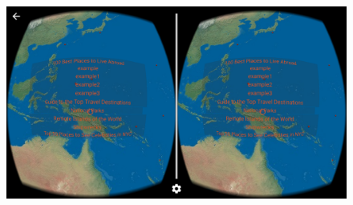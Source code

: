 \begin{figure}[H]
	\centering
	\includegraphics[width=\linewidth, keepaspectratio]{Figures/Screenshots/device-2016-10-28-013605.png}
	\decoRule
\end{figure}

